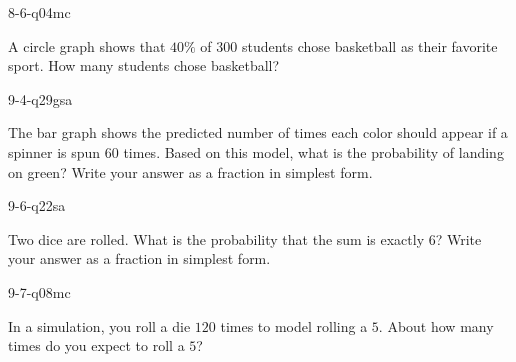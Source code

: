 \begin{practiceQuestion}{8-6-q04}{mc}
\begin{questionText}
A circle graph shows that $40\%$ of $300$ students chose basketball as their favorite sport. How many students chose basketball?
\end{questionText}
\end{practiceQuestion}

\begin{practiceQuestion}{9-4-q29}{gsa}
\begin{questionText}
The bar graph shows the predicted number of times each color should appear if a spinner is spun $60$ times. Based on this model, what is the probability of landing on green? Write your answer as a fraction in simplest form.

\begin{center}
\end{center}
\end{questionText}
\end{practiceQuestion}

\begin{practiceQuestion}{9-6-q22}{sa}
\begin{questionText}
Two dice are rolled. What is the probability that the sum is exactly $6$? Write your answer as a fraction in simplest form.
\end{questionText}
\end{practiceQuestion}

\begin{practiceQuestion}{9-7-q08}{mc}
\begin{questionText}
In a simulation, you roll a die $120$ times to model rolling a $5$. About how many times do you expect to roll a $5$?
\end{questionText}
\end{practiceQuestion}
